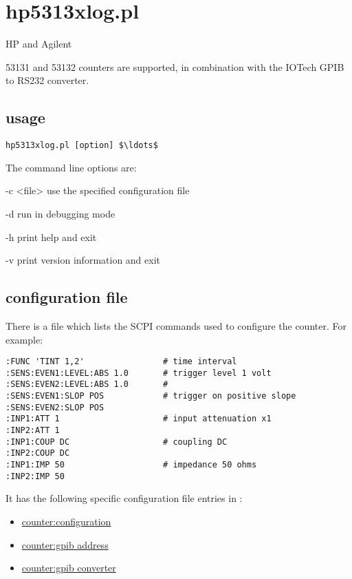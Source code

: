 \section{hp5313xlog.pl}

\hypertarget{h:hp5313xlog}{HP and Agilent} 53131 and 53132 counters are supported, in combination
with the IOTech GPIB to RS232 converter.

\subsection{usage}

\begin{lstlisting}[mathescape=true]
hp5313xlog.pl [option] $\ldots$ 
\end{lstlisting}

The command line options are:
\begin{description*}
	\item[-c \textless file\textgreater] use the specified configuration file
	\item[-d]	run in debugging mode
	\item[-h]	print help and exit
	\item[-v]	print version information and exit
\end{description*}

\subsection{configuration file}

There is a file  which lists the SCPI commands used to configure the counter.
For example:
\begin{lstlisting}
:FUNC 'TINT 1,2'                # time interval
:SENS:EVEN1:LEVEL:ABS 1.0       # trigger level 1 volt
:SENS:EVEN2:LEVEL:ABS 1.0       #
:SENS:EVEN1:SLOP POS            # trigger on positive slope
:SENS:EVEN2:SLOP POS
:INP1:ATT 1                     # input attenuation x1
:INP2:ATT 1
:INP1:COUP DC                   # coupling DC
:INP2:COUP DC
:INP1:IMP 50                    # impedance 50 ohms
:INP2:IMP 50
\end{lstlisting}

It has the following specific configuration file entries in :
\begin{itemize}
	\item \hyperlink{h:counter_configuration}{counter:configuration}
	\item \hyperlink{h:counter_gpib_address}{counter:gpib address}
	\item \hyperlink{h:counter_gpib_converter}{counter:gpib converter}
\end{itemize}

